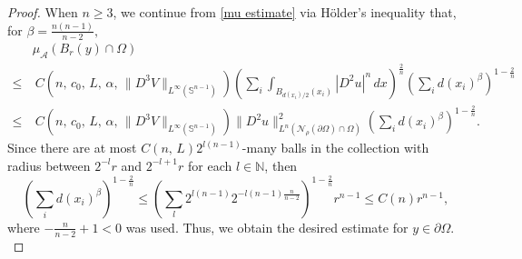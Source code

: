 \documentclass[10pt,a4paper]{amsart}
\def\az{\alpha}
\begin{document}
\begin{proof}
When $n\ge 3$, we continue from \eqref{mu estimate} via H\"older's inequality that, for $\beta=\frac{n(n-1)}{n-2},$
\begin{align*}
    & \mu_\mathcal A({B_r(y)\cap \Omega})\\
    \le & \  C(n,\,c_0,\,L,\,\az,\, \|D^3V\|_{L^\infty(\mathbb S^{n-1})}) \left( \sum_i \int_{B_{d(x_i)/2}(x_i)} |D^2 u|^n\, dx\right)^{\frac 2 n}\left(\sum_id(x_i)^\beta\right)^{1-\frac 2 n}   \\
    \le & \  C(n,\,c_0,\,L,\,\az,\, \|D^3V\|_{L^\infty(\mathbb S^{n-1})}) \| D^2 u\|^{2}_{L^n(\mathcal N_\rho(\partial \Omega)\cap \Omega)}\left(\sum_id(x_i)^\beta\right)^{1-\frac 2 n}.
\end{align*}
Since there are at most $C(n,\,L)2^{l(n-1)} $-many balls in the collection with radius between $2^{-l} r$ and $2^{-l+1}r$ for each $l\in \mathbb N$, then
$$\left(\sum_id(x_i)^\beta\right)^{ 1-\frac 2 n}\le \left(\sum_l 2^{l(n-1)} 2^{-l(n-1)\frac{n}{n-2}}\right)^{ 1-\frac 2 n} r^{n-1}\le C(n)r^{n-1},$$
where  $-\frac{n}{n-2}+1<0$ was used. 
Thus, we obtain the desired estimate for $y\in \partial \Omega. $   
\end{proof}
\end{document}
